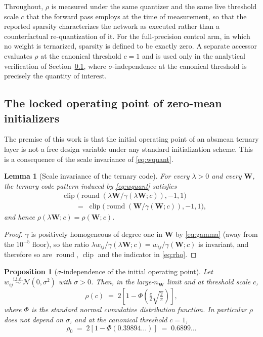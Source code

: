 \documentclass[final,5p,times,twocolumn]{elsarticle}
\newtheorem{proposition}{Proposition}
\newtheorem{lemma}{Lemma}
\theoremstyle{remark}
\newcommand{\Wm}{\mathbf{W}}
\newcommand{\rhoz}{\rho_{0}}
\newcommand{\clip}{\operatorname{clip}}
\newcommand{\round}{\operatorname{round}}
\begin{document}
Throughout, $\rho$ is measured under the same quantizer and the
same live threshold scale $c$ that the forward pass employs at the time
of measurement, so that the reported sparsity characterizes the network as
executed rather than a counterfactual re-quantization of it. For the
full-precision control arm, in which no weight is ternarized, sparsity is
defined to be exactly zero. A separate accessor evaluates $\rho$ at the
canonical threshold $c=1$ and is used only in the analytical verification of
Section~\ref{sec:locking}, where $\sigma$-independence at the canonical
threshold is precisely the quantity of interest.

\subsection{The locked operating point of zero-mean initializers}
\label{sec:locking}

The premise of this work is that the initial operating point of an absmean
ternary layer is not a free design variable under any standard initialization
scheme. This is a consequence of the scale invariance of
\eqref{eq:wquant}.

\begin{lemma}[Scale invariance of the ternary code]
\label{lem:scaleinv}
For every $\lambda > 0$ and every $\Wm$, the ternary code pattern induced by
\eqref{eq:wquant} satisfies
\[
\begin{aligned}
&\clip\!\big(\round(\lambda\Wm/\gamma(\lambda\Wm;c)),-1,1\big)\\[0.3ex]
&\qquad=\; \clip\!\big(\round(\Wm/\gamma(\Wm;c)),-1,1\big),
\end{aligned}
\]
and hence $\rho(\lambda\Wm;c) = \rho(\Wm;c)$.
\end{lemma}

\begin{proof}
$\gamma$ is positively homogeneous of degree one in $\Wm$ by \eqref{eq:gamma}
(away from the $10^{-5}$ floor), so the ratio $\lambda w_{ij}/\gamma(\lambda
\Wm;c) = w_{ij}/\gamma(\Wm;c)$ is invariant, and therefore so are $\round$,
$\clip$ and the indicator in \eqref{eq:rho}.
\end{proof}

\begin{proposition}[$\sigma$-independence of the initial operating point]
\label{prop:locked}
Let $w_{ij} \stackrel{\text{i.i.d.}}{\sim} \mathcal{N}(0,\sigma^{2})$ with
$\sigma > 0$. Then, in the large-$n_{\Wm}$ limit and at threshold scale $c$,
\begin{equation}
\label{eq:rho_of_c}
\rho(c) \;=\; 2\left[1 - \Phi\!\left(\tfrac{c}{2}\sqrt{\tfrac{2}{\pi}}\right)\right],
\end{equation}
where $\Phi$ is the standard normal cumulative distribution function. In
particular $\rho$ does not depend on $\sigma$, and at the canonical threshold
$c=1$,
\begin{equation}
\label{eq:rho069}
\rhoz \;=\; 2\left[1-\Phi(0.39894\ldots)\right] \;=\; 0.6899\ldots
\end{equation}
\end{proposition}
\end{document}
